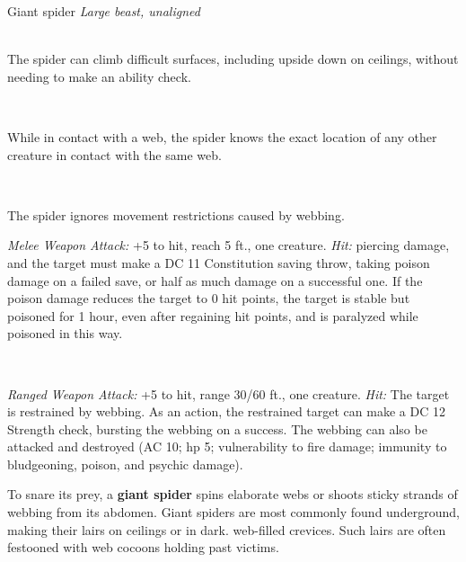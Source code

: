 \documentclass[10pt,twoside,twocolumn,openany]{book}
\begin{document}
\begin{monsterboxnobg}{Giant spider}
	\textit{Large beast, unaligned}\\
	\hline
	\basics[
		armorclass	= 14 (natural armor),
		hitpoints		= \dice{4d10 + 4},
		speed		= {30 ft., climb 30 ft.}
	]
	\hline
	\stats[
		STR	= \stat{14},
		DEX	= \stat{16},
		CON	= \stat{12},
		INT	= \stat{2},
		WIS	= \stat{11},
		CHA	= \stat{4}
	]
	\hline
	\details[
		skills			= {Stealth +7},
		senses		= {blindsight 10 ft., darkvision 60 ft., passive Perception 10},
		languages		= {-},
		challenge		= 1
	]
	\hline \\[1mm]
	\begin{monsteraction}
		The spider can climb difficult surfaces, including upside down on ceilings, without needing to make an ability check.
	\end{monsteraction}\\
	\begin{monsteraction}
		While in contact with a web, the spider knows the exact location of any other creature in contact with the same web.
	\end{monsteraction}\\
	\begin{monsteraction}
		The spider ignores movement restrictions caused by webbing.
	\end{monsteraction}
	\begin{monsteraction}[Bite]
		\textit{Melee Weapon Attack:} +5 to hit, reach 5 ft., one creature. \textit{Hit:}  piercing damage, and the target must make a DC 11 Constitution saving throw, taking  poison damage on a failed save, or half as much damage on a successful one. If the poison damage reduces the target to 0 hit points, the target is stable but poisoned for 1 hour, even after regaining hit points, and is paralyzed while poisoned in this way.
	\end{monsteraction}\\
	\begin{monsteraction}
		\textit{Ranged Weapon Attack:} +5 to hit, range 30/60 ft., one creature. \textit{Hit:} The target is restrained by webbing. As an action, the restrained target can make a DC 12 Strength check, bursting the webbing on a success. The webbing can also be attacked and destroyed (AC 10; hp 5; vulnerability to fire damage; immunity to bludgeoning, poison, and psychic damage).	
	\end{monsteraction}
	
	To snare its prey, a \textbf{giant spider} spins elaborate webs or shoots sticky strands of webbing from its abdomen. Giant spiders are most commonly found underground, making their lairs on ceilings or in dark. web-filled crevices. Such lairs are often festooned with web cocoons holding past victims.
\end{monsterboxnobg}
\end{document}

